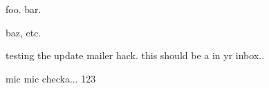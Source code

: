 foo. bar.

baz, etc.

testing the update mailer hack.  this should be a \delta in yr inbox..

mic mic checka... 123
